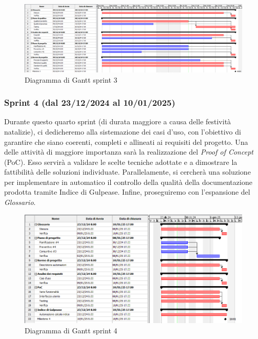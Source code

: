         \begin{figure}[h!]
            \centering
            \includegraphics[scale = 0.3]{template/images/gantt3.png}
            \caption{Diagramma di Gantt sprint 3}
            \label{fig:3.3} %
        \end{figure}

        \subsubsection{Sprint 4 (dal 23/12/2024 al 10/01/2025)}
        Durante questo quarto sprint (di durata maggiore a causa delle festività natalizie), ci dedicheremo alla sistemazione dei casi d'uso, con l'obiettivo di garantire che siano coerenti, completi e allineati ai requisiti del progetto. 
        Una delle attività di maggiore importanza sarà la realizzazione del \textit{Proof of Concept} (PoC). Esso servirà a validare le scelte tecniche adottate e a dimostrare la fattibilità delle soluzioni individuate. 
        Parallelamente, si cercherà una soluzione per implementare in automatico il controllo della qualità della documentazione prodotta tramite Indice di Gulpease. 
        Infine, proseguiremo con l'espansione del \textit{Glossario}.

        \begin{figure}[h!]
            \centering
            \includegraphics[scale = 0.45]{template/images/gantt4.png}
            \caption{Diagramma di Gantt sprint 4}
            \label{fig:3.4} %
        \end{figure}

